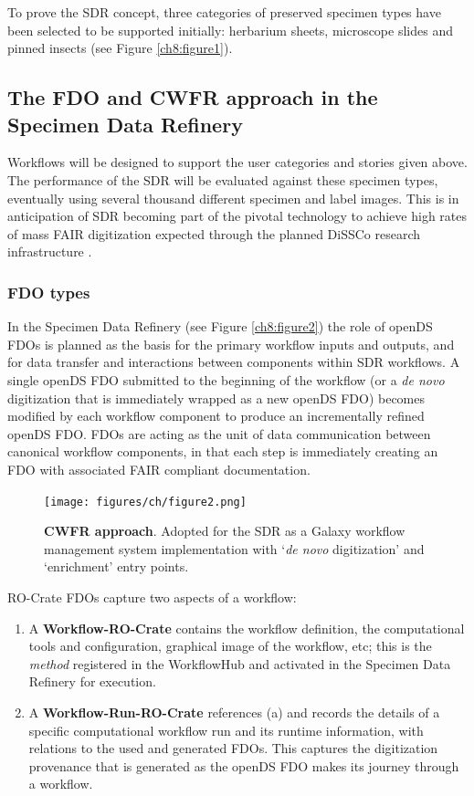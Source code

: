 To prove the SDR concept, three categories of preserved specimen types
have been selected to be supported initially: herbarium sheets,
microscope slides and pinned insects (see Figure \vref{ch8:figure1}).

\subsection{The FDO and CWFR approach in the Specimen Data Refinery}\label{the-fdo-and-cwfr-approach-in-the-specimen-data-refinery}

Workflows will be designed to support the user categories and stories
given above. The performance of the SDR will be evaluated against these
specimen types, eventually using several thousand different specimen and
label images. This is in anticipation of SDR becoming part of the
pivotal technology to achieve high rates of mass FAIR digitization
expected through the planned DiSSCo research infrastructure \cite{ch8-6,ch8-5,ch8-30}.

\subsubsection{FDO types}\label{fdo-types}

In the Specimen Data Refinery (see Figure \vref{ch8:figure2}) the role of openDS FDOs is
planned as the basis for the primary workflow inputs and outputs, and
for data transfer and interactions between components within SDR
workflows. A single openDS FDO submitted to the beginning of the
workflow (or a \emph{de novo} digitization that is immediately wrapped
as a new openDS FDO) becomes modified by each workflow component to
produce an incrementally refined openDS FDO. FDOs are acting as the unit
of data communication between canonical workflow components, in that
each step is immediately creating an FDO with associated FAIR compliant
documentation.

\begin{figure}%
  \texttt{[image: figures/ch/figure2.png]}
	\caption[CWFR approach]{\textbf{CWFR approach}. Adopted for the SDR as a Galaxy 
  workflow management system
  implementation with `\emph{de novo} digitization' and `enrichment' entry points.}
  \label{ch8:figure2}
\end{figure}


RO-Crate FDOs capture two aspects of a workflow:

\begin{enumerate}
\item
  A \textbf{Workflow-RO-Crate} contains the workflow definition, the
  computational tools and configuration, graphical image of the
  workflow, etc; this is the \emph{method} registered in the WorkflowHub
  and activated in the Specimen Data Refinery for execution.
\item
  A \textbf{Workflow-Run-RO-Crate} references (a) and records the
  details of a specific computational workflow run and its runtime
  information, with relations to the used and generated FDOs. This
  captures the digitization provenance that is generated as the openDS
  FDO makes its journey through a workflow.
\end{enumerate}

